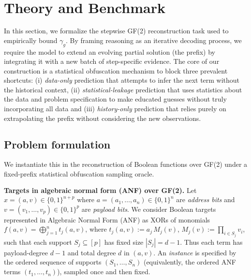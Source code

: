 \documentclass{article}
\begin{document}



\section{Theory and Benchmark}\label{sec:theory}

In this section, we formalize the stepwise GF(2) reconstruction task used to empirically bound $\gamma_g$. By framing reasoning as an iterative decoding process, we require the model to extend an evolving partial solution (the prefix) by integrating it with a new batch of step-specific evidence. The core of our construction is a statistical obfuscation mechanism to block three prevalent shortcuts: (i) \emph{data-only} prediction that attempts to infer the next term without the historical context, (ii) \emph{statistical-leakage} prediction that uses statistics about the data and problem specification to make educated guesses without truly incorporating all data and (iii) \emph{history-only} prediction that relies purely on extrapolating the prefix without considering the new observations.

\subsection{Problem formulation}\label{sec:theory:estimators}

We instantiate this in the reconstruction of Boolean functions over GF(2) under a fixed-prefix statistical obfuscation sampling oracle.

{\bf Targets in algebraic normal form (ANF) over GF(2).\enspace}
Let $x=(a,v)\in\{0,1\}^{n+p}$ where $a=(a_1,\dots,a_n)\in\{0,1\}^n$ are \emph{address bits} and
$v=(v_1,\dots,v_p)\in\{0,1\}^p$ are \emph{payload bits}. We consider Boolean targets represented in Algebraic Normal Form (ANF) as XORs of monomials $f(a,v) = \bigoplus_{j=1}^{n} t_j(a,v)$, where $t_j(a,v):= a_j\,M_j(v)$, $M_j(v):=\prod_{i\in S_j} v_i$, such that each support $S_j\subseteq[p]$ has fixed size $|S_j|=d-1$.
Thus each term has payload-degree $d{-}1$ and total degree $d$ in $(a,v)$.
An \emph{instance} is specified by the ordered sequence of supports $(S_1,\dots,S_n)$
(equivalently, the ordered ANF terms $(t_1,\dots,t_n)$), sampled once and then fixed.
\end{document}
